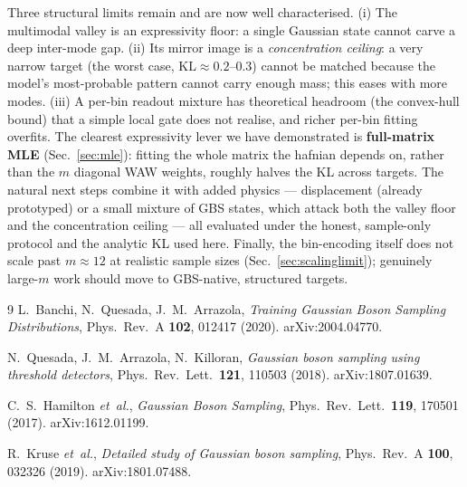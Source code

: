 \documentclass[11pt,a4paper]{article}
\begin{document}
Three structural limits remain and are now well characterised. (i) The
multimodal valley is an expressivity floor: a single Gaussian state cannot carve
a deep inter-mode gap. (ii) Its mirror image is a \emph{concentration ceiling}:
a very narrow target (the worst case, $\mathrm{KL}\approx0.2$--$0.3$) cannot be
matched because the model's most-probable pattern cannot carry enough mass;
this eases with more modes. (iii) A per-bin readout mixture has theoretical
headroom (the convex-hull bound) that a simple local gate does not realise, and
richer per-bin fitting overfits. The clearest expressivity lever we have
demonstrated is \textbf{full-matrix MLE} (Sec.~\ref{sec:mle}): fitting the whole
matrix the hafnian depends on, rather than the $m$ diagonal WAW weights, roughly
halves the KL across targets. The natural next steps combine it with added
physics --- displacement (already prototyped) or a small mixture of GBS states,
which attack both the valley floor and the concentration ceiling --- all
evaluated under the honest, sample-only protocol and the analytic KL used here.
Finally, the bin-encoding itself does not scale past $m\!\approx\!12$ at
realistic sample sizes (Sec.~\ref{sec:scalinglimit}); genuinely large-$m$ work
should move to GBS-native, structured targets.

\begin{thebibliography}{9}
L.~Banchi, N.~Quesada, J.~M.~Arrazola,
\textit{Training Gaussian Boson Sampling Distributions},
Phys.\ Rev.\ A \textbf{102}, 012417 (2020). arXiv:2004.04770.

N.~Quesada, J.~M.~Arrazola, N.~Killoran,
\textit{Gaussian boson sampling using threshold detectors},
Phys.\ Rev.\ Lett.\ \textbf{121}, 110503 (2018). arXiv:1807.01639.

C.~S.~Hamilton \textit{et~al.},
\textit{Gaussian Boson Sampling},
Phys.\ Rev.\ Lett.\ \textbf{119}, 170501 (2017). arXiv:1612.01199.

R.~Kruse \textit{et~al.},
\textit{Detailed study of Gaussian boson sampling},
Phys.\ Rev.\ A \textbf{100}, 032326 (2019). arXiv:1801.07488.
\end{thebibliography}
\end{document}
